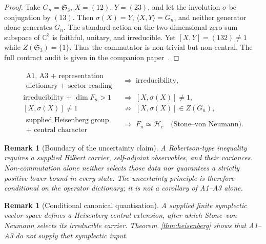 \documentclass[11pt,a4paper]{article}
\newtheorem{remark}[theorem]{Remark}
\begin{document}
    \begin{proof}
      Take $G_n=\mathfrak{S}_3$, $X=(12)$, $Y=(23)$, and let the involution
      $\sigma$ be conjugation by $(13)$.
      Then $\sigma(X)=Y$, $\langle X,Y\rangle=G_n$, and neither generator alone
      generates $G_n$.
      The standard action on the two-dimensional zero-sum subspace of
      $\mathbb{C}^3$ is faithful, unitary, and irreducible.
      Yet $[X,Y]=(132)\neq 1$ while $Z(\mathfrak{S}_3)=\{1\}$.
      Thus the commutator is non-trivial but non-central.
      The full contract audit is given in the companion
      paper~\cite{Beau2026HeisenbergStructure}.
    \end{proof}

    \begin{equation}
      \begin{aligned}
        \substack{\text{A1, A3 + representation}\\\text{dictionary + sector reading}}
        &\;\Longrightarrow\; \text{irreducibility},\\
        \text{irreducibility + }\dim F_n>1
        &\;\Longrightarrow\; [X,\sigma(X)]\neq 1,\\
        [X,\sigma(X)]\neq 1
        &\;\not\Longrightarrow\; [X,\sigma(X)]\in Z(G_n),\\
        \substack{\text{supplied Heisenberg group}\\
                  \text{+ central character}}
        &\;\Longrightarrow\; F_n\simeq\mathcal{H}_c
        \quad\text{(Stone--von Neumann).}
      \end{aligned}
    \end{equation}

    \begin{remark}[Boundary of the uncertainty claim]
      \label{rem:uncertainty}
      A Robertson-type inequality requires a supplied Hilbert carrier,
      self-adjoint observables, and their variances.
      Non-commutation alone neither selects those data nor guarantees a strictly
      positive lower bound in every state.
      The uncertainty principle is therefore conditional on the operator
      dictionary; it is not a corollary of A1--A3 alone.
    \end{remark}

    \begin{remark}[Conditional canonical quantisation]
      A supplied finite symplectic vector space defines a Heisenberg central
      extension, after which Stone--von Neumann selects its irreducible carrier.
      Theorem~\ref{thm:heisenberg} shows that A1--A3 do not supply that symplectic
      input.
    \end{remark}
\end{document}
